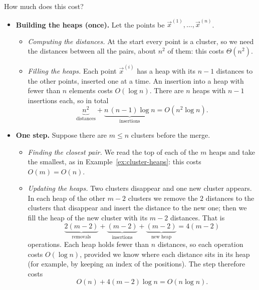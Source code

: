 \documentclass[a4paper,12pt,oneside]{report}
\begin{document}
How much does this cost?

\begin{itemize}
  \item \textbf{Building the heaps (once).} Let the points be
    $\vec x^{(1)},\ldots,\vec x^{(n)}$.
    \begin{itemize}
      \item \emph{Computing the distances.} At the start every point
        is a cluster, so we need the distances between all the pairs,
        about $n^2$ of them: this costs $\Theta(n^2)$.
      \item \emph{Filling the heaps.} Each point $\vec x^{(i)}$ has a
        heap with its $n-1$ distances to the other points, inserted one
        at a time. An insertion into a heap with fewer than $n$
        elements costs $O(\log n)$. There are $n$ heaps with $n-1$
        insertions each, so in total
        \[
          \underbrace{n^2}_{\text{distances}}
          +\underbrace{n\,(n-1)\log n}_{\text{insertions}}
          =O(n^2\log n).
        \]
    \end{itemize}
  \item \textbf{One step.} Suppose there are $m\leq n$ clusters
    before the merge.
    \begin{itemize}
      \item \emph{Finding the closest pair.} We read the top of each
        of the $m$ heaps and take the smallest, as in
        Example~\ref{ex:cluster-heaps}: this costs $O(m)=O(n)$.
      \item \emph{Updating the heaps.} Two clusters disappear and one
        new cluster appears. In each heap of the other $m-2$ clusters
        we remove the $2$ distances to the clusters that disappear
        and insert the distance to the new one; then we fill the heap
        of the new cluster with its $m-2$ distances. That is
        \[
          \underbrace{2(m-2)}_{\text{removals}}
          +\underbrace{(m-2)}_{\text{insertions}}
          +\underbrace{(m-2)}_{\text{new heap}}
          =4(m-2)
        \]
        operations. Each heap holds fewer than $n$ distances, so each
        operation costs $O(\log n)$, provided we know where each
        distance sits in its heap (for example, by keeping an index of
        the positions). The step therefore costs
        \[
          O(n)+4(m-2)\log n=O(n\log n).
        \]
    \end{itemize}
\end{itemize}
\end{document}
